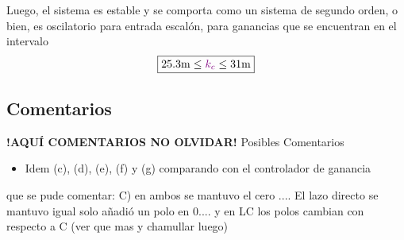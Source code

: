 Luego, el sistema es estable y se comporta como un sistema de segundo orden, o
bien, es oscilatorio para entrada escalón, para ganancias que se encuentran en
el intervalo
\begin{equation}
    \boxed{25.3\unit{m} \leq \mora{k_{c}} \leq 31\unit{m}}
\end{equation}

\FloatBarrier
\subsection{Comentarios}


\textbf{!AQUÍ COMENTARIOS NO OLVIDAR!}
Posibles Comentarios
\begin{itemize}
    \item Idem (c), (d), (e), (f) y (g) comparando con el controlador de ganancia
\end{itemize}


que se pude comentar:
 C) en ambos se mantuvo el cero .... El lazo directo se mantuvo igual solo añadió un polo en 0.... y en LC los polos cambian con respecto a C  (ver que mas y chamullar luego)
